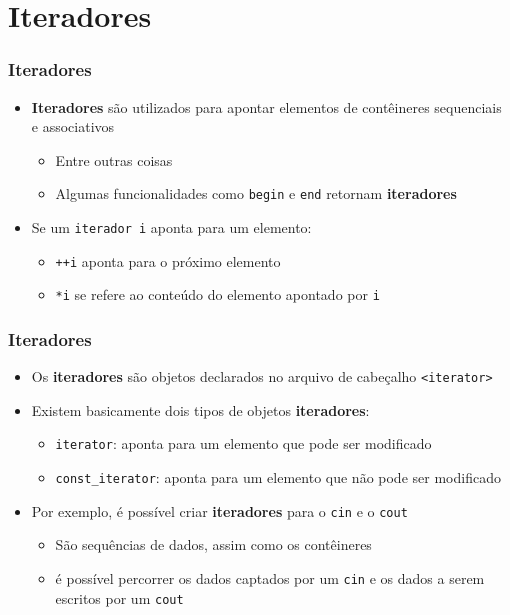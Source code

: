 \documentclass[xcolor={dvipsnames,table},aspectratio=169]{beamer}
\begin{document}
\section{Iteradores}

\begin{frame}\frametitle{Iteradores}
\begin{itemize}
	\item \textbf{Iteradores} são utilizados para apontar elementos de contêineres sequenciais e associativos
	\begin{itemize}
		\item Entre outras coisas
		\item Algumas funcionalidades como \texttt{begin} e \texttt{end} retornam \textbf{iteradores}
		\end{itemize}
	\item Se um \texttt{iterador i} aponta para um elemento:
	\begin{itemize}
		\item \texttt{++i} aponta para o próximo elemento
		\item \texttt{*i} se refere ao conteúdo do elemento apontado por \texttt{i}
		\end{itemize}
\end{itemize}
\end{frame}

\begin{frame}\frametitle{Iteradores}
\begin{itemize}
	\item Os \textbf{iteradores} são objetos declarados no arquivo de cabeçalho \texttt{<iterator>}
	\item Existem basicamente dois tipos de objetos \textbf{iteradores}:
	\begin{itemize}
		\item \texttt{iterator}: aponta para um elemento que pode ser modificado
		\item \texttt{const\_iterator}: aponta para um elemento que não pode ser modificado
		\end{itemize}
	\item Por exemplo, é possível criar \textbf{iteradores} para o \texttt{cin} e o \texttt{cout}
	\begin{itemize}
		\item São sequências de dados, assim como os contêineres
		\item é possível percorrer os dados captados por um \texttt{cin} e os dados a serem escritos por um \texttt{cout}
	\end{itemize}
\end{itemize}
\end{frame}
\end{document}
